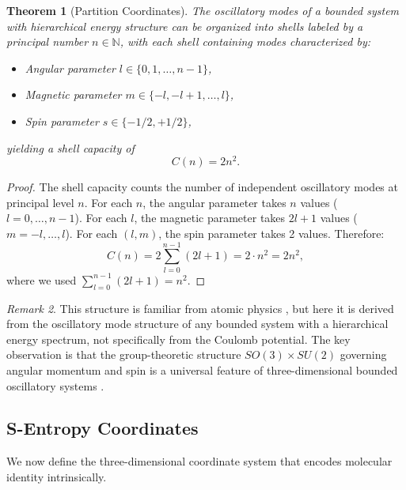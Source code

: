 \documentclass[11pt,twocolumn,a4paper]{article}
\newtheorem{theorem}{Theorem}[section]
\theoremstyle{definition}
\theoremstyle{remark}
\newtheorem{remark}[theorem]{Remark}
\newcommand{\Natural}{\mathbb{N}}
\begin{document}
\begin{theorem}[Partition Coordinates]\label{thm:partition-coords}
The oscillatory modes of a bounded system with hierarchical energy structure can be organized into shells labeled by a principal number $n \in \Natural$, with each shell containing modes characterized by:
\begin{itemize}
  \item Angular parameter $l \in \{0, 1, \ldots, n-1\}$,
  \item Magnetic parameter $m \in \{-l, -l+1, \ldots, l\}$,
  \item Spin parameter $s \in \{-1/2, +1/2\}$,
\end{itemize}
yielding a shell capacity of
\begin{equation}\label{eq:shell-capacity}
  C(n) = 2n^2.
\end{equation}
\end{theorem}

\begin{proof}
The shell capacity counts the number of independent oscillatory modes at principal level $n$. For each $n$, the angular parameter takes $n$ values ($l = 0, \ldots, n-1$). For each $l$, the magnetic parameter takes $2l + 1$ values ($m = -l, \ldots, l$). For each $(l, m)$, the spin parameter takes 2 values. Therefore:
\begin{equation}
  C(n) = 2 \sum_{l=0}^{n-1} (2l + 1) = 2 \cdot n^2 = 2n^2,
\end{equation}
where we used $\sum_{l=0}^{n-1}(2l+1) = n^2$.
\end{proof}

\begin{remark}
This structure is familiar from atomic physics \citep{bohr1913,griffiths2018}, but here it is derived from the oscillatory mode structure of any bounded system with a hierarchical energy spectrum, not specifically from the Coulomb potential. The key observation is that the group-theoretic structure $SO(3) \times SU(2)$ governing angular momentum and spin is a universal feature of three-dimensional bounded oscillatory systems \citep{wigner1959,hall2015}.
\end{remark}

\subsection{S-Entropy Coordinates}\label{sec:s-coords}

We now define the three-dimensional coordinate system that encodes molecular identity intrinsically.
\end{document}
